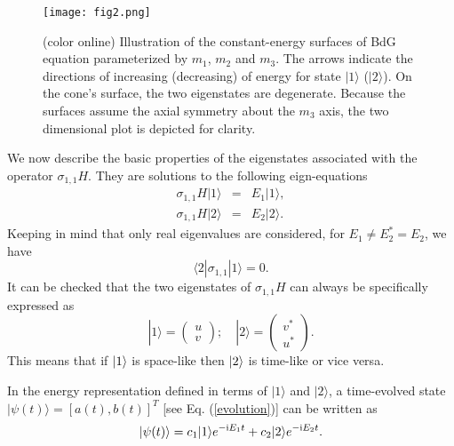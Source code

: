 \documentclass[pra,epsfig,rotate,superscriptaddress,showpacs]{revtex4}
\begin{document}
\begin{figure}[t]
\texttt{[image: fig2.png]}
\caption{(color online) Illustration of the constant-energy surfaces of BdG equation parameterized by $m_1$, $m_2$ and $m_3$. The arrows indicate the directions of increasing (decreasing) of energy for state $|1\rangle$ ($|2\rangle$). On the cone's surface, the two eigenstates are degenerate. Because the surfaces assume the axial symmetry about the $m_3$ axis, the two dimensional plot is depicted for clarity.}
\label{Fig:2}
\end{figure}

We now describe the basic properties of the eigenstates associated with the operator $\sigma_{1,1}H$. They are solutions to the following eign-equations
\begin{eqnarray} \label{eigenequation}
\sigma_{1,1} H|1\rangle&=&E_1|1\rangle, \\ \label{eigenequation2}
\sigma_{1,1} H|2\rangle&=&E_2|2\rangle.
\end{eqnarray}
Keeping in mind that only real eigenvalues are considered, for $E_1\neq E_2^*=E_2$, we have
\begin{equation} \label{orthoF}
\langle 2 |\sigma_{1,1}|1\rangle=0.
\end{equation}
It can be checked that the two eigenstates of $\sigma_{1,1}H$ can always be specifically expressed as \begin{equation}  \label{eigen-vec}
|1\rangle=\left(\begin{array}{c}u \\v\end{array} \right); \quad
|2\rangle=\left(\begin{array}{c}v^* \\u^*\end{array} \right).
\end{equation}
This means that if $\ket{1}$ is space-like then $\ket{2}$ is time-like or vice versa.

In the energy representation defined in terms of $|1\rangle$ and $|2\rangle$, a time-evolved state $|\psi(t)\rangle=[a(t),b(t)]^T$ [see Eq. (\ref{evolution})] can be written as
\begin{equation} \label{evo-form}
|\psi(t)\rangle=c_1|1\rangle e^{-{\text i}E_1t}+c_2
|2\rangle e^{-{\text i}E_2t}.
\end{equation}
\end{document}

